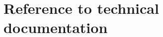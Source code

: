 \documentclass[a4paper, 11pt]{article} %
\begin{document}
  \section{Reference to technical documentation}
  \label{ap:doc}
  


\clearpage

%



\end{document}
